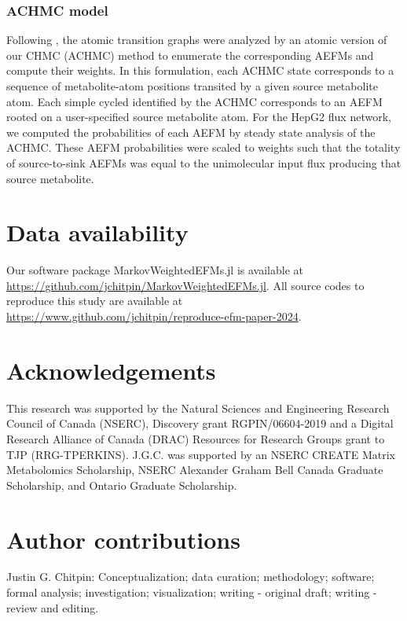 \documentclass[12pt]{article}
\begin{document}
\subsubsection*{ACHMC model}

Following \citeauthor{ChitpinJustinG2023AMct}, the atomic transition
graphs were analyzed by an atomic version of our CHMC (ACHMC) method to
enumerate the corresponding AEFMs and compute their weights. In this
formulation, each ACHMC state corresponds to a sequence of metabolite-atom
positions transited by a given source metabolite atom. Each simple cycled
identified by the ACHMC corresponds to an AEFM rooted on a user-specified
source metabolite atom. For the HepG2 flux network, we computed the
probabilities of each AEFM by steady state analysis of the ACHMC. These
AEFM probabilities were scaled to weights such that the totality of
source-to-sink AEFMs was equal to the unimolecular input flux producing
that source metabolite.

\section*{Data availability}

Our software package MarkovWeightedEFMs.jl is available at
\url{https://github.com/jchitpin/MarkovWeightedEFMs.jl}. All source codes
to reproduce this study are available at
\url{https://www.github.com/jchitpin/reproduce-efm-paper-2024}.

\section*{Acknowledgements}

This research was supported by the Natural Sciences and Engineering
Research Council of Canada (NSERC), Discovery grant RGPIN/06604-2019 and
a Digital Research Alliance of Canada (DRAC) Resources for Research Groups
grant to TJP (RRG-TPERKINS). J.G.C. was supported by an NSERC CREATE
Matrix Metabolomics Scholarship, NSERC Alexander Graham Bell Canada
Graduate Scholarship, and Ontario Graduate Scholarship.

\section*{Author contributions}

Justin G. Chitpin: Conceptualization; data curation; methodology;
software; formal analysis; investigation; visualization; writing
- original draft; writing - review and editing.\\
\end{document}
